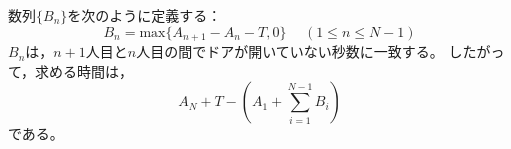 \documentclass{article}
\begin{document}
数列$\{B_n\}$を次のように定義する：
\begin{equation}
    B_n = \mathrm{max}\{A_{n + 1} - A_n - T, 0\} \hspace{15pt} (1 \leq n \leq N - 1)
\end{equation}
$B_n$は，$n + 1$人目と$n$人目の間でドアが開いていない秒数に一致する。
したがって，求める時間は，
\begin{equation}
    A_N + T - \left(A_1 + \sum_{i = 1}^{N - 1} B_i \right)
\end{equation}
である。
\end{document}
